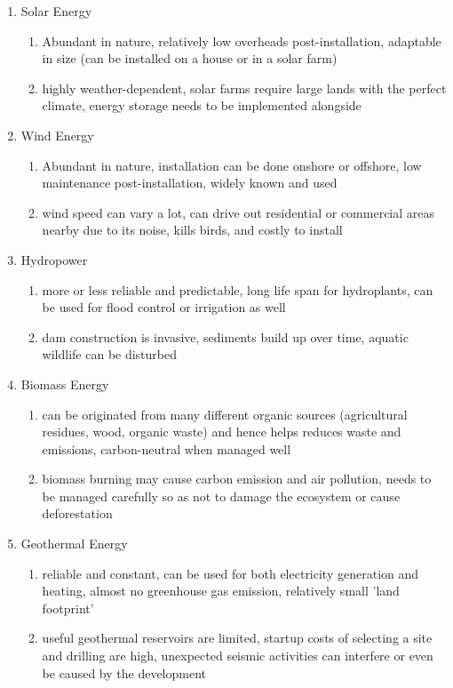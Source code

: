 \documentclass{article}
\begin{document}
\begin{enumerate}
    \item Solar Energy 
    \begin{enumerate}
        \item Abundant in nature, relatively low overheads post-installation, adaptable in size (can be installed on a house or in a solar farm)
        \item highly weather-dependent, solar farms require large lands with the perfect climate, energy storage needs to be implemented alongside
    \end{enumerate}
    \item Wind Energy
    \begin{enumerate}
        \item Abundant in nature, installation can be done onshore or offshore, low maintenance post-installation, widely known and used 
        \item wind speed can vary a lot, can drive out residential or commercial areas nearby due to its noise, kills birds, and costly to install 
    \end{enumerate}
    \item Hydropower 
    \begin{enumerate}
        \item more or less reliable and predictable, long life span for hydroplants, can be used for flood control or irrigation as well 
        \item dam construction is invasive, sediments build up over time, aquatic wildlife can be disturbed
    \end{enumerate}
    \item Biomass Energy
    \begin{enumerate}
        \item can be originated from many different organic sources (agricultural residues, wood, organic waste) and hence helps reduces waste and emissions, carbon-neutral when managed well
        \item biomass burning may cause carbon emission and air pollution, needs to be managed carefully so as not to damage the ecosystem or cause deforestation 
    \end{enumerate}
    \item Geothermal Energy 
    \begin{enumerate}
        \item reliable and constant, can be used for both electricity generation and heating, almost no greenhouse gas emission, relatively small 'land footprint'
        \item useful geothermal reservoirs are limited, startup costs of selecting a site and drilling are high, unexpected seismic activities can interfere or even be caused by the development
    \end{enumerate}
\end{enumerate}
\end{document}

